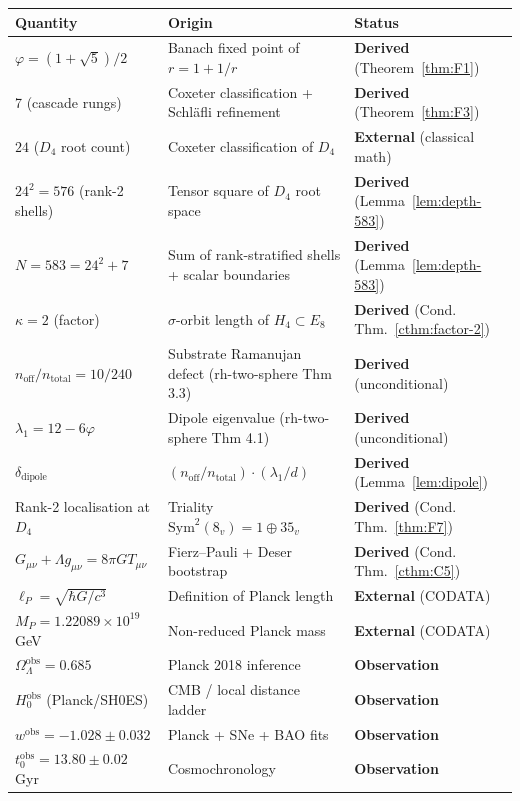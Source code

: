 \documentclass[11pt]{article}
\theoremstyle{plain}
\theoremstyle{definition}
\theoremstyle{remark}
\begin{document}
\begin{center}
\renewcommand{\arraystretch}{1.25}
\begin{tabular}{lll}
\toprule
\textbf{Quantity} & \textbf{Origin} & \textbf{Status} \\
\midrule
$\varphi = (1+\sqrt{5})/2$ & Banach fixed point of $r = 1 + 1/r$ & \textbf{Derived} (Theorem~\ref{thm:F1}) \\
7 (cascade rungs) & Coxeter classification + Schl\"afli refinement & \textbf{Derived} (Theorem~\ref{thm:F3}) \\
$24$ ($D_4$ root count) & Coxeter classification of $D_4$ & \textbf{External} (classical math) \\
$24^2 = 576$ (rank-2 shells) & Tensor square of $D_4$ root space & \textbf{Derived} (Lemma~\ref{lem:depth-583}) \\
$N = 583 = 24^2 + 7$ & Sum of rank-stratified shells + scalar boundaries & \textbf{Derived} (Lemma~\ref{lem:depth-583}) \\
$\kappa = 2$ (factor) & $\sigma$-orbit length of $H_4 \subset E_8$ & \textbf{Derived} (Cond.\,Thm.~\ref{cthm:factor-2}) \\
$n_\mathrm{off}/n_\mathrm{total} = 10/240$ & Substrate Ramanujan defect (rh-two-sphere Thm 3.3) & \textbf{Derived} (unconditional) \\
$\lambda_1 = 12 - 6\varphi$ & Dipole eigenvalue (rh-two-sphere Thm 4.1) & \textbf{Derived} (unconditional) \\
$\delta_\mathrm{dipole}$ & $(n_\mathrm{off}/n_\mathrm{total}) \cdot (\lambda_1/d)$ & \textbf{Derived} (Lemma~\ref{lem:dipole}) \\
Rank-2 localisation at $D_4$ & Triality $\mathrm{Sym}^2(8_v) = 1 \oplus 35_v$ & \textbf{Derived} (Cond.\,Thm.~\ref{thm:F7}) \\
$G_{\mu\nu} + \Lambda g_{\mu\nu} = 8\pi G T_{\mu\nu}$ & Fierz--Pauli + Deser bootstrap & \textbf{Derived} (Cond.\,Thm.~\ref{cthm:C5}) \\
$\ell_P = \sqrt{\hbar G/c^3}$ & Definition of Planck length & \textbf{External} (CODATA) \\
$M_P = 1.22089 \times 10^{19}$ GeV & Non-reduced Planck mass & \textbf{External} (CODATA) \\
\midrule
$\Omega_\Lambda^{\mathrm{obs}} = 0.685$ & Planck 2018 inference & \textbf{Observation} \\
$H_0^{\mathrm{obs}}$ (Planck/SH0ES) & CMB / local distance ladder & \textbf{Observation} \\
$w^{\mathrm{obs}} = -1.028 \pm 0.032$ & Planck + SNe + BAO fits & \textbf{Observation} \\
$t_0^{\mathrm{obs}} = 13.80 \pm 0.02$ Gyr & Cosmochronology & \textbf{Observation} \\
\bottomrule
\end{tabular}
\end{center}
\end{document}
